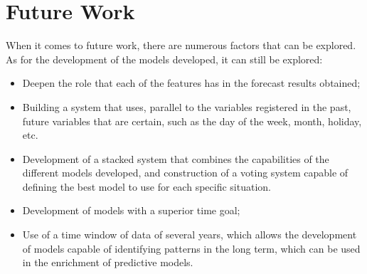 \section{Future Work}

When it comes to future work, there are numerous factors that can be explored. As for the development of the models developed, it can still be explored: 

\begin{itemize}
\setlength\itemsep{0.1em}
    \item Deepen the role that each of the features has in the forecast results obtained;
    \item Building a system that uses, parallel to the variables registered in the past, future variables that are certain, such as the day of the week, month, holiday, etc.
    \item Development of a stacked system that combines the capabilities of the different models developed, and construction of a voting system capable of defining the best model to use for each specific situation.
    \item Development of models with a superior time goal;
    \item Use of a time window of data of several years, which allows the development of models capable of identifying patterns in the long term, which can be used in the enrichment of predictive models.
\end{itemize}